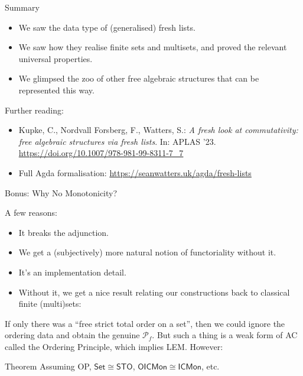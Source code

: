 \documentclass[aspectratio=169]{beamer}
\begin{document}
\begin{frame}{Summary}

\begin{itemize}
  \item We saw the data type of (generalised) fresh lists.
  \smallskip
  \item We saw how they realise finite sets and multisets, and proved the relevant universal properties.
  \smallskip
  \item We glimpsed the zoo of other free algebraic structures that can be represented this way.
\end{itemize}

\bigskip

 Further reading:
\begin{itemize}
  \item Kupke, C., Nordvall Forsberg, F., Watters, S.: \emph{A fresh look at commutativity: free algebraic structures via fresh lists}. In: APLAS '23. \\
  \smallskip
        \url{https://doi.org/10.1007/978-981-99-8311-7_7}
  \item Full Agda formalisation: \url{https://seanwatters.uk/agda/fresh-lists}
\end{itemize}
\end{frame}

\begin{frame}{Bonus: Why No Monotonicity?}

A few reasons:
\begin{itemize}
  \smallskip
\item It breaks the adjunction.
  \smallskip
\item We get a (subjectively) more natural notion of functoriality without it.
  \smallskip
\item It's an implementation detail.
  \smallskip
\item Without it, we get a nice result relating our constructions back to classical finite (multi)sets:
\end{itemize}
\bigskip

 If only there was a ``free strict total order on a set'', then we could ignore the ordering data and obtain the genuine $\mathcal{P}_{f}$.
 But such a thing is a weak form of AC called the Ordering Principle, which implies LEM.
 However:

\bigskip
\begin{block}{Theorem}
Assuming OP, $\mathsf{Set} \cong \mathsf{STO}$, $\mathsf{OICMon} \cong \mathsf{ICMon}$, etc.
\end{block}
\end{frame}
\end{document}
